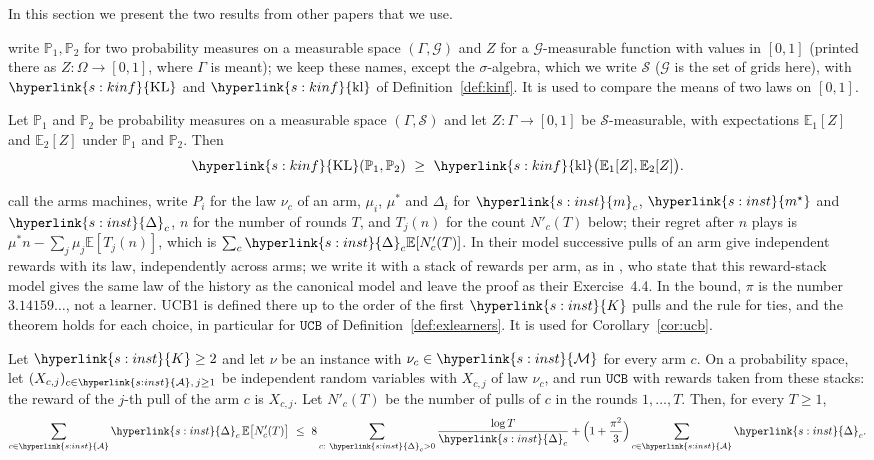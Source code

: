 \documentclass[11pt]{article}
\newcommand{\sy}[2]{{\hyperlink{#1}{#2}}}
\newcommand{\E}{\mathbb{E}}
\newcommand{\1}{\mathbf{1}}
\newcommand{\Arms}{\sy{s:inst}{\mathcal A}}
\newcommand{\Kar}{\sy{s:inst}{K}}
\newcommand{\Mu}{\sy{s:inst}{\mathcal M}}
\newcommand{\mean}{\sy{s:inst}{m}}
\newcommand{\ms}{\sy{s:inst}{m^\star}}
\newcommand{\Dg}{\sy{s:inst}{\Delta}}
\newcommand{\KL}{\sy{s:kinf}{\mathrm{KL}}}
\newcommand{\kl}{\sy{s:kinf}{\mathrm{kl}}}
\newcommand{\UCB}{\hyperref[def:exlearners]{\texttt{UCB}}}
\begin{document}
In this section we present the two results from other papers that we use.

\citet{GMS19} write $\mathbb P_1,\mathbb P_2$ for two probability measures on a measurable space
$(\Gamma,\mathcal G)$ and $Z$ for a $\mathcal G$-measurable function with values in $[0,1]$ (printed
there as $Z:\Omega\to[0,1]$, where $\Gamma$ is meant); we keep these names, except the
$\sigma$-algebra, which we write $\mathcal S$ ($\mathcal G$ is the set of grids here), with $\KL$
and $\kl$ of Definition~\ref{def:kinf}. It is used to compare the means of two laws on $[0,1]$.

\begin{lemma}\label{cite:GMS19-lem1}
Let $\mathbb P_1$ and $\mathbb P_2$ be probability measures on a measurable space
$(\Gamma,\mathcal S)$ and let $Z:\Gamma\to[0,1]$ be $\mathcal S$-measurable, with expectations
$\E_1[Z]$ and $\E_2[Z]$ under $\mathbb P_1$ and $\mathbb P_2$. Then
\begin{equation*}
  \KL(\mathbb P_1,\mathbb P_2)\ \ge\ \kl\big(\E_1[Z],\E_2[Z]\big).
\end{equation*}
\end{lemma}

\citet{ACF02} call the arms machines, write $P_i$ for the law $\nu_c$ of an arm, $\mu_i$, $\mu^*$
and $\Delta_i$ for $\mean_c$, $\ms$ and $\Dg_c$, $n$ for the number of rounds $T$, and $T_j(n)$ for
the count $N'_c(T)$ below; their regret after $n$ plays is $\mu^*n-\sum_j\mu_j\E[T_j(n)]$, which is
$\sum_c\Dg_c\E[N'_c(T)]$. In their model successive pulls of an arm give independent rewards with
its law, independently across arms; we write it with a stack of rewards per arm, as in
\citet[Section~4.6]{LS}, who state that this reward-stack model gives the same law of the history
as the canonical model and leave the proof as their Exercise~4.4. In the bound, $\pi$ is the number
$3.14159\ldots$, not a learner. UCB1 is defined there up to the order of the first $\Kar$ pulls and the
rule for ties, and the theorem holds for each choice, in particular for $\UCB$ of
Definition~\ref{def:exlearners}. It is used for Corollary~\ref{cor:ucb}.

\begin{theorem}\label{cite:ACF02-thm1}
Let $\Kar\ge2$ and let $\nu$ be an instance with $\nu_c\in\Mu$ for every arm $c$. On a probability
space, let $(X_{c,j})_{c\in\Arms,\,j\ge1}$ be independent random variables with $X_{c,j}$ of law
$\nu_c$, and run $\UCB$ with rewards taken from these stacks: the reward of the $j$-th pull of the
arm $c$ is $X_{c,j}$. Let $N'_c(T)$ be the number of pulls of $c$ in the rounds $1,\dots,T$. Then,
for every $T\ge1$,
\begin{equation*}
  \sum_{c\in\Arms}\Dg_c\,\E\big[N'_c(T)\big]\ \le\ 8\sum_{c:\ \Dg_c>0}\frac{\log T}{\Dg_c}
  +\Big(1+\frac{\pi^2}{3}\Big)\sum_{c\in\Arms}\Dg_c .
\end{equation*}
\end{theorem}
\end{document}
